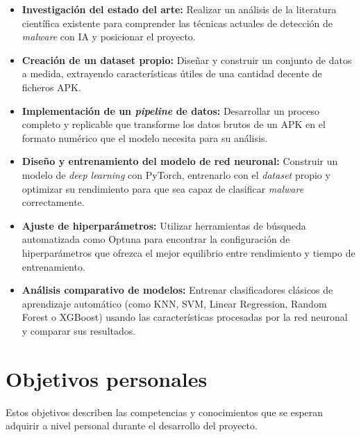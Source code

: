 \begin{itemize}
	\item \textbf{Investigación del estado del arte:} Realizar un análisis de la literatura científica existente para comprender las técnicas actuales de detección de \textit{malware} con IA y posicionar el proyecto.
	
	\item \textbf{Creación de un dataset propio:} Diseñar y construir un conjunto de datos a medida, extrayendo características útiles de una cantidad decente de ficheros APK.
	
	\item \textbf{Implementación de un \textit{pipeline} de datos:} Desarrollar un proceso completo y replicable que transforme los datos brutos de un APK en el formato numérico que el modelo necesita para su análisis.
	
	\item \textbf{Diseño y entrenamiento del modelo de red neuronal:} Construir un modelo de \textit{deep learning} con PyTorch, entrenarlo con el \textit{dataset} propio y optimizar su rendimiento para que sea capaz de clasificar \textit{malware} correctamente.
	
	\item \textbf{Ajuste de hiperparámetros:} Utilizar herramientas de búsqueda automatizada como Optuna para encontrar la configuración de hiperparámetros que ofrezca el mejor equilibrio entre rendimiento y tiempo de entrenamiento.
	
	\item \textbf{Análisis comparativo de modelos:} Entrenar clasificadores clásicos de aprendizaje automático (como KNN, SVM, Linear Regression, Random Forest o XGBoost) usando las características procesadas por la red neuronal y comparar sus resultados.
\end{itemize}

\section{Objetivos personales}
Estos objetivos describen las competencias y conocimientos que se esperan adquirir a nivel personal durante el desarrollo del proyecto.

